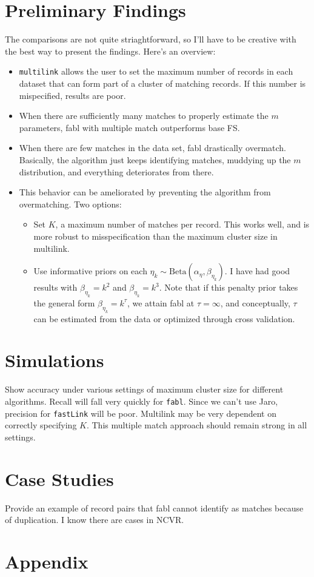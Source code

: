\documentclass[12pt,letterpaper]{article}
\newcommand{\1}[1]{\mathbb{I}\!\left[#1\right]} %
\begin{document}
\section{Preliminary Findings}
The comparisons are not quite striaghtforward, so I'll have to be creative with the best way to present the findings. Here's an overview:
\begin{itemize}
	\item \texttt{multilink} allows the user to set the maximum number of records in each dataset that can form part of a cluster of matching records. If this number is mispecified, results are poor.
	\item When there are sufficiently many matches to properly estimate the $m$ parameters, fabl with multiple match outperforms base FS. 
	\item When there are few matches in the data set, fabl drastically overmatch. Basically, the algorithm just keeps identifying matches, muddying up the $m$ distribution, and everything deteriorates from there. 
	\item This behavior can be ameliorated by preventing the algorithm from overmatching. Two options:
	\begin{itemize}
		\item Set $K$, a maximum number of matches per record. This works well, and is more robust to misspecification than the maximum cluster size in multilink.
		\item Use informative priors on each $\eta_k \sim \text{Beta}(\alpha_{\eta}, \beta_{\eta_k})$. I have had good results with $\beta_{\eta_k} = k^2$ and $\beta_{\eta_k} = k^3$. Note that if this penalty prior takes the general form $\beta_{\eta_k} = k^{\tau}$, we attain fabl at $\tau = \infty$, and conceptually, $\tau$ can be estimated from the data or optimized through cross validation. 
	\end{itemize}
\end{itemize}

\section{Simulations}
Show accuracy under various settings of maximum cluster size for different algorithms. Recall will fall very quickly for \texttt{fabl}. Since we can't use Jaro, precision for \texttt{fastLink} will be poor.  Multilink may be very dependent on correctly specifying $K$. This multiple match approach should remain strong in all settings. 
\section{Case Studies}

 Provide an example of record pairs that fabl cannot identify as matches because of duplication. I know there are cases in NCVR.




\section{Appendix}
\label{sec:appendix}
\end{document}
